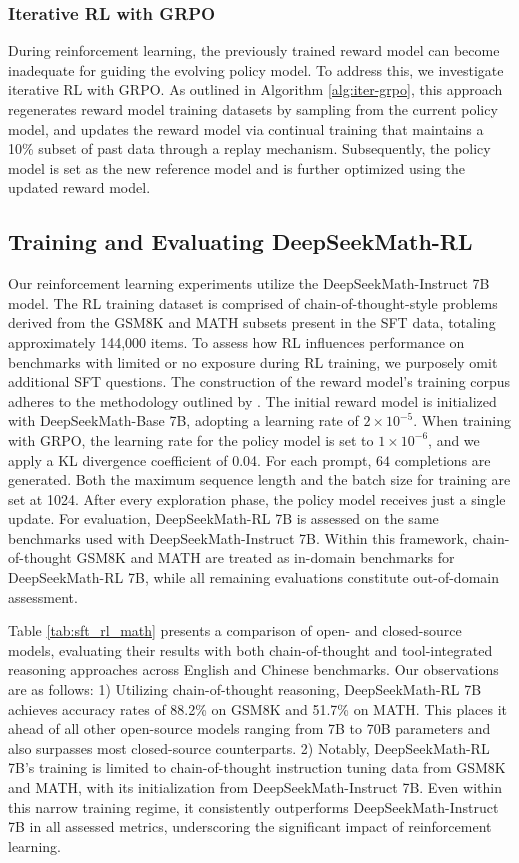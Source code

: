 \begin{itemize}[topsep=0pt]
\begin{itemize}[topsep=0pt]
\subsubsection{Iterative RL with GRPO} During reinforcement learning, the previously trained reward model can become inadequate for guiding the evolving policy model. To address this, we investigate iterative RL with GRPO. As outlined in Algorithm \ref{alg:iter-grpo}, this approach regenerates reward model training datasets by sampling from the current policy model, and updates the reward model via continual training that maintains a 10\% subset of past data through a replay mechanism. Subsequently, the policy model is set as the new reference model and is further optimized using the updated reward model.

\subsection{Training and Evaluating DeepSeekMath-RL}

Our reinforcement learning experiments utilize the DeepSeekMath-Instruct 7B model. The RL training dataset is comprised of chain-of-thought-style problems derived from the GSM8K and MATH subsets present in the SFT data, totaling approximately 144,000 items. To assess how RL influences performance on benchmarks with limited or no exposure during RL training, we purposely omit additional SFT questions. The construction of the reward model’s training corpus adheres to the methodology outlined by \citep{wang2023math}. The initial reward model is initialized with DeepSeekMath-Base 7B, adopting a learning rate of $2 \times 10^{-5}$. When training with GRPO, the learning rate for the policy model is set to $1 \times 10^{-6}$, and we apply a KL divergence coefficient of 0.04. For each prompt, $64$ completions are generated. Both the maximum sequence length and the batch size for training are set at 1024. After every exploration phase, the policy model receives just a single update. For evaluation, DeepSeekMath-RL 7B is assessed on the same benchmarks used with DeepSeekMath-Instruct 7B. Within this framework, chain-of-thought GSM8K and MATH are treated as in-domain benchmarks for DeepSeekMath-RL 7B, while all remaining evaluations constitute out-of-domain assessment.

Table \ref{tab:sft_rl_math} presents a comparison of open- and closed-source models, evaluating their results with both chain-of-thought and tool-integrated reasoning approaches across English and Chinese benchmarks. Our observations are as follows: 1) Utilizing chain-of-thought reasoning, DeepSeekMath-RL 7B achieves accuracy rates of 88.2\% on GSM8K and 51.7\% on MATH. This places it ahead of all other open-source models ranging from 7B to 70B parameters and also surpasses most closed-source counterparts. 2) Notably, DeepSeekMath-RL 7B’s training is limited to chain-of-thought instruction tuning data from GSM8K and MATH, with its initialization from DeepSeekMath-Instruct 7B. Even within this narrow training regime, it consistently outperforms DeepSeekMath-Instruct 7B in all assessed metrics, underscoring the significant impact of reinforcement learning.


\end{itemize}
\end{itemize}
